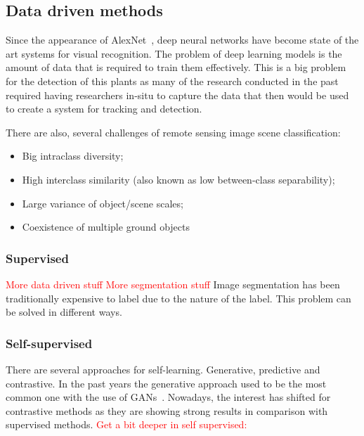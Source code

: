 \documentclass[conference]{IEEEtran}
\begin{document}
    \subsection*{Data driven methods}
    Since the appearance of AlexNet~\cite{NIPS2012_c399862d}, deep neural networks have become state of the art systems for visual recognition.
    The problem of deep learning models is the amount of data that is required to train them effectively.
    This is a big problem for the detection of this plants as many of the research conducted in the past required having researchers in-situ to capture the data that then
    would be used to create a system for tracking and detection.

    There are also, several challenges of remote sensing image scene classification\cite{9127795}:
    \begin{itemize}
        \item Big intraclass diversity;
        \item High interclass similarity (also known as low between-class separability);
        \item Large variance of object/scene scales;
        \item Coexistence of multiple ground objects
    \end{itemize}

    \subsubsection{Supervised}

    \textcolor{red}{More data driven stuff\cite{9127795, Mendieta2023GFMBG, jean2019tile2vec, akiva2020h2onet}}
    \textcolor{red}{More segmentation stuff \cite{Li_2022, inproceedings, 9460820, kirillov2023segment, akiva2020h2onet, 10135093}}
    Image segmentation has been traditionally expensive to label due to the nature of the label.
    This problem can be solved in different ways.

    \subsubsection{Self-supervised}

    There are several approaches for self-learning.
    Generative, predictive and contrastive.
    In the past years the generative approach used to be the most common one with the use of GANs~\cite{goodfellow2014generative, radford2016unsupervised}.
    Nowadays, the interest has shifted for contrastive methods as they are showing strong results in comparison with supervised methods.
    \textcolor{red}{Get a bit deeper in self supervised: \cite{wang2022selfsupervised, DINO, barlowtwins, Li_2022, grill2020bootstrap, Jung2021SelfsupervisedLW, li2022efficient, caron2021unsupervised, inproceedings, 9460820}}
\end{document}

